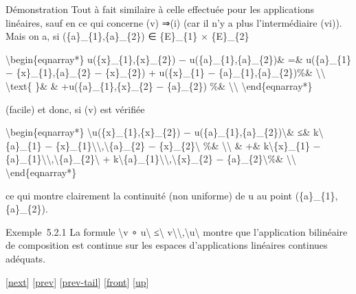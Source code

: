\documentclass[]{article}
\begin{document}
Démonstration Tout à fait similaire à celle effectuée pour les
applications linéaires, sauf en ce qui concerne (v) ⇒(i) (car il n'y a
plus l'intermédiaire (vi)). Mais on a, si (\{a\}\_\{1\},\{a\}\_\{2\}) ∈
\{E\}\_\{1\} × \{E\}\_\{2\}

\textbackslash{}begin\{eqnarray*\} u(\{x\}\_\{1\},\{x\}\_\{2\}) −
u(\{a\}\_\{1\},\{a\}\_\{2\})\& =\& u(\{a\}\_\{1\} −
\{x\}\_\{1\},\{a\}\_\{2\} − \{x\}\_\{2\}) + u(\{x\}\_\{1\} −
\{a\}\_\{1\},\{a\}\_\{2\})\%\& \textbackslash{}\textbackslash{}
\textbackslash{}text\{ \}\& \& +u(\{a\}\_\{1\},\{x\}\_\{2\} −
\{a\}\_\{2\}) \%\& \textbackslash{}\textbackslash{}
\textbackslash{}end\{eqnarray*\}

(facile) et donc, si (v) est vérifiée

\textbackslash{}begin\{eqnarray*\}
\textbackslash{}\textbar{}u(\{x\}\_\{1\},\{x\}\_\{2\}) −
u(\{a\}\_\{1\},\{a\}\_\{2\})\textbackslash{}\textbar{}\& ≤\&
k\textbackslash{}\textbar{}\{a\}\_\{1\} −
\{x\}\_\{1\}\textbackslash{}\textbar{}\textbackslash{},\textbackslash{}\textbar{}\{a\}\_\{2\}
− \{x\}\_\{2\}\textbackslash{}\textbar{} \%\&
\textbackslash{}\textbackslash{} \& +\&
k\textbackslash{}\textbar{}\{x\}\_\{1\} −
\{a\}\_\{1\}\textbackslash{}\textbar{}\textbackslash{},\textbackslash{}\textbar{}\{a\}\_\{2\}\textbackslash{}\textbar{}
+
k\textbackslash{}\textbar{}\{a\}\_\{1\}\textbackslash{}\textbar{}\textbackslash{},\textbackslash{}\textbar{}\{x\}\_\{2\}
− \{a\}\_\{2\}\textbackslash{}\textbar{}\%\&
\textbackslash{}\textbackslash{} \textbackslash{}end\{eqnarray*\}

ce qui montre clairement la continuité (non uniforme) de u au point
(\{a\}\_\{1\},\{a\}\_\{2\}).

Exemple~5.2.1 La formule \textbackslash{}\textbar{}v ∘
u\textbackslash{}\textbar{} ≤\textbackslash{}\textbar{}
v\textbackslash{}\textbar{}\textbackslash{},\textbackslash{}\textbar{}u\textbackslash{}\textbar{}
montre que l'application bilinéaire de composition est continue sur les
espaces d'applications linéaires continues adéquats.

{[}\href{coursse29.html}{next}{]} {[}\href{coursse27.html}{prev}{]}
{[}\href{coursse27.html\#tailcoursse27.html}{prev-tail}{]}
{[}\href{coursse28.html}{front}{]}
{[}\href{coursch6.html\#coursse28.html}{up}{]}
\end{document}

